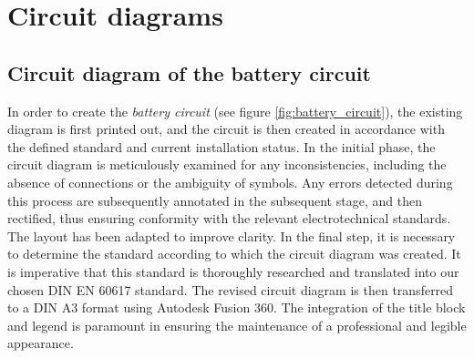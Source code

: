 




%

%

%
\section{Circuit diagrams}
\subsection{Circuit diagram of the battery circuit}
In order to create the \textit{battery circuit} (see figure \ref{fig:battery_circuit}), the existing diagram is first printed out, and the circuit is then created in accordance with the defined standard and current installation status. In the initial phase, the circuit diagram is meticulously examined for any inconsistencies, including the absence of connections or the ambiguity of symbols. Any errors detected during this process are subsequently annotated in the subsequent stage, and then rectified, thus ensuring conformity with the relevant electrotechnical standards. The layout has been adapted to improve clarity. In the final step, it is necessary to determine the standard according to which the circuit diagram was created. It is imperative that this standard is thoroughly researched and \glqq translated\grqq {} into our chosen DIN EN 60617 standard. The revised circuit diagram is then transferred to a DIN A3 format using Autodesk Fusion 360. The integration of the title block and legend is paramount in ensuring the maintenance of a professional and legible appearance.

